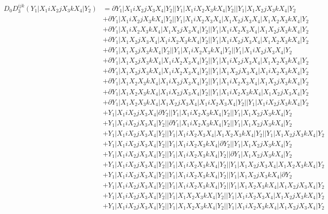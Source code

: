 \documentclass{article}[12pt]
\begin{document}
\begin{align*}
D_0 D_3^{ijk}(Y_1|X_1iX_2jX_3kX_4|Y_2)& =\partial Y_1|X_1iX_2jX_3X_4|Y_2||Y_1|X_1iX_2X_3kX_4|Y_2||Y_1|X_1X_2jX_3kX_4|Y_2\\ 
 & +\partial Y_1|X_1iX_2jX_3kX_4|Y_2||Y_1|X_1iX_2X_3X_4|X_1X_2jX_3X_4|X_1X_2X_3kX_4|Y_2\\ 
 & +\partial Y_1|X_1iX_2X_3kX_4|X_1X_2jX_3X_4|Y_2||Y_1|X_1iX_2X_3X_4|X_1X_2jX_3kX_4|Y_2\\ 
 & +\partial Y_1|X_1X_2jX_3X_4|X_1iX_2X_3kX_4|Y_2||Y_1|X_1iX_2jX_3X_4|X_1X_2X_3kX_4|Y_2\\ 
 & +\partial Y_1|X_1X_2jX_3kX_4|Y_2||Y_1|X_1iX_2X_3kX_4|Y_2||Y_1|X_1iX_2jX_3X_4|Y_2\\ 
 & +\partial Y_1|X_1X_2jX_3kX_4|X_1iX_2X_3X_4|Y_2||Y_1|X_1iX_2jX_3X_4|X_1X_2X_3kX_4|Y_2\\ 
 & +\partial Y_1|X_1X_2jX_3kX_4|X_1iX_2X_3X_4|Y_2||Y_1|X_1X_2jX_3X_4|X_1iX_2X_3kX_4|Y_2\\ 
 & +\partial Y_1|X_1X_2X_3kX_4|X_1iX_2jX_3X_4|Y_2||Y_1|X_1iX_2X_3X_4|X_1X_2jX_3kX_4|Y_2\\ 
 & +\partial Y_1|X_1X_2X_3kX_4|X_1iX_2jX_3X_4|Y_2||Y_1|X_1iX_2X_3kX_4|X_1X_2jX_3X_4|Y_2\\ 
 & +\partial Y_1|X_1X_2X_3kX_4|X_1X_2jX_3X_4|X_1iX_2X_3X_4|Y_2||Y_1|X_1iX_2jX_3kX_4|Y_2\\ 
 & +Y_1|X_1iX_2jX_3X_4|\partial Y_2||Y_1|X_1iX_2X_3kX_4|Y_2||Y_1|X_1X_2jX_3kX_4|Y_2\\ 
 & +Y_1|X_1iX_2jX_3X_4|Y_2||\partial Y_1|X_1iX_2X_3kX_4|Y_2||Y_1|X_1X_2jX_3kX_4|Y_2\\ 
 & +Y_1|X_1iX_2jX_3X_4|Y_2||Y_1|X_1iX_2X_3X_4|X_1X_2X_3kX_4|Y_2||Y_1|X_1X_2jX_3kX_4|Y_2\\ 
 & +Y_1|X_1iX_2jX_3X_4|Y_2||Y_1|X_1iX_2X_3kX_4|\partial Y_2||Y_1|X_1X_2jX_3kX_4|Y_2\\ 
 & +Y_1|X_1iX_2jX_3X_4|Y_2||Y_1|X_1iX_2X_3kX_4|Y_2||\partial Y_1|X_1X_2jX_3kX_4|Y_2\\ 
 & +Y_1|X_1iX_2jX_3X_4|Y_2||Y_1|X_1iX_2X_3kX_4|Y_2||Y_1|X_1X_2jX_3X_4|X_1X_2X_3kX_4|Y_2\\ 
 & +Y_1|X_1iX_2jX_3X_4|Y_2||Y_1|X_1iX_2X_3kX_4|Y_2||Y_1|X_1X_2jX_3kX_4|\partial Y_2\\ 
 & +Y_1|X_1iX_2jX_3X_4|Y_2||Y_1|X_1iX_2X_3kX_4|Y_2||Y_1|X_1X_2X_3kX_4|X_1X_2jX_3X_4|Y_2\\ 
 & +Y_1|X_1iX_2jX_3X_4|Y_2||Y_1|X_1X_2X_3kX_4|Y_2||Y_1|X_1iX_2X_3X_4|X_1X_2jX_3kX_4|Y_2\\ 
 & +Y_1|X_1iX_2jX_3X_4|Y_2||Y_1|X_1X_2X_3kX_4|Y_2||Y_1|X_1iX_2X_3kX_4|X_1X_2jX_3X_4|Y_2\\ 

\end{align*}
\end{document}
